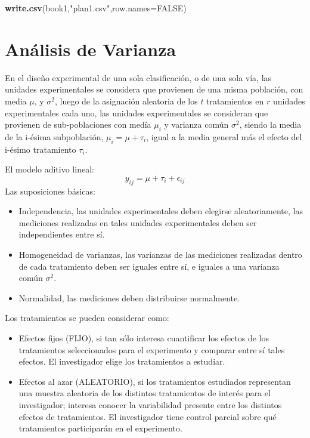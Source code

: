 \documentclass[]{book}
\newenvironment{Shaded}{\begin{snugshade}}{\end{snugshade}}
\newcommand{\KeywordTok}[1]{\textcolor[rgb]{0.13,0.29,0.53}{\textbf{#1}}}
\newcommand{\DataTypeTok}[1]{\textcolor[rgb]{0.13,0.29,0.53}{#1}}
\newcommand{\StringTok}[1]{\textcolor[rgb]{0.31,0.60,0.02}{#1}}
\newcommand{\OtherTok}[1]{\textcolor[rgb]{0.56,0.35,0.01}{#1}}
\newcommand{\NormalTok}[1]{#1}
\begin{document}
\begin{Shaded}
\begin{Highlighting}[]
\KeywordTok{write.csv}\NormalTok{(book1,}\StringTok{"plan1.csv"}\NormalTok{,}\DataTypeTok{row.names=}\OtherTok{FALSE}\NormalTok{)}
\end{Highlighting}
\end{Shaded}

\section{Análisis de Varianza}\label{analisis-de-varianza}

En el diseño experimental de una sola clasificación, o de una sola vía,
las unidades experimentales se considera que provienen de una misma
población, con media \(\mu\), y \(\sigma^2\), luego de la asignación
aleatoria de los \(t\) tratamientos en \(r\) unidades experimentales
cada uno, las unidades experimentales se consideran que provienen de
sub-poblaciones con medía \(\mu_i\) y varianza común \(\sigma^2\),
siendo la media de la i-ésima subpoblación, \(\mu_i=\mu +\tau_i\), igual
a la media general más el efecto del i-ésimo tratamiento \(\tau_i\).

El modelo aditivo lineal: \[y_{ij}=\mu + \tau_i+\epsilon_{ij}\] Las
suposiciones básicas:

\begin{itemize}
\item
  Independencia, las unidades experimentales deben elegirse
  aleatoriamente, las mediciones realizadas en tales unidades
  experimentales deben ser independientes entre sí.
\item
  Homogeneidad de varianzas, las varianzas de las mediciones realizadas
  dentro de cada tratamiento deben ser iguales entre sí, e iguales a una
  varianza común \(\sigma^2\).
\item
  Normalidad, las mediciones deben distribuirse normalmente.
\end{itemize}

Los tratamientos se pueden considerar como:

\begin{itemize}
\item
  Efectos fijos (FIJO), si tan sólo interesa cuantificar los efectos de
  los tratamientos seleccionados para el experimento y comparar entre sí
  tales efectos. El investigador elige los tratamientos a estudiar.
\item
  Efectos al azar (ALEATORIO), si los tratamientos estudiados
  representan una muestra aleatoria de los distintos tratamientos de
  interés para el investigador; interesa conocer la variabilidad
  presente entre los distintos efectos de tratamientos. El investigador
  tiene control parcial sobre qué tratamientos participarán en el
  experimento.
\end{itemize}
\end{document}
